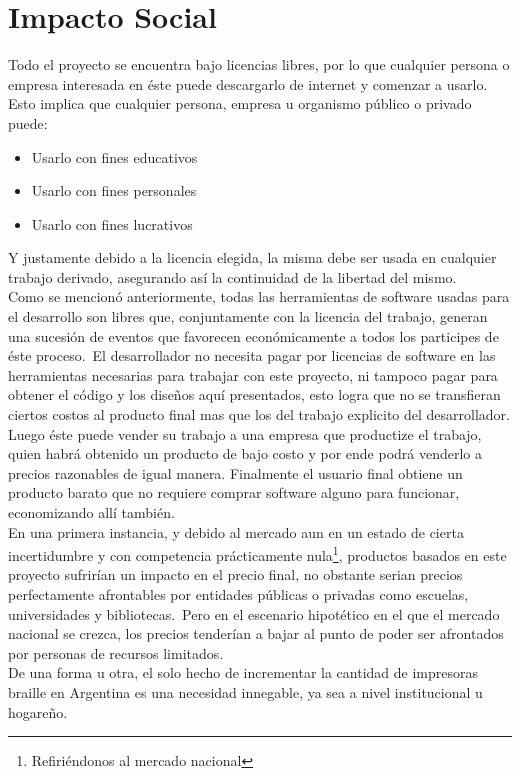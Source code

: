 \chapter{Impacto Social}

Todo el proyecto se encuentra bajo licencias libres, por lo que cualquier
persona o empresa interesada en \'este puede descargarlo de internet y
comenzar a usarlo. Esto implica que cualquier persona, empresa u organismo
p\'ublico o privado puede:

\begin{itemize}
 \item Usarlo con fines educativos
 \item Usarlo con fines personales
 \item Usarlo con fines lucrativos
\end{itemize}

Y justamente debido a la licencia elegida, la misma debe ser usada en cualquier
trabajo derivado, asegurando as\'i la continuidad de la libertad del mismo.\\

Como se mencion\'o anteriormente, todas las herramientas de software usadas
para el desarrollo son libres que, conjuntamente con la licencia del trabajo,
generan una sucesi\'on de eventos que favorecen econ\'omicamente a todos los
participes de \'este proceso.\
El desarrollador no necesita pagar por licencias de software en las
herramientas necesarias para trabajar con este proyecto, ni tampoco pagar para
obtener el c\'odigo y los dise\~nos aqu\'i presentados, esto logra que no se
transfieran ciertos costos al producto final mas que los del trabajo explicito
del desarrollador. Luego \'este puede vender su trabajo a una empresa que
productize el trabajo, quien habr\'a obtenido un producto de bajo costo y por
ende podr\'a venderlo a precios razonables de igual manera. Finalmente el
usuario final obtiene un producto barato que no requiere comprar software
alguno para funcionar, economizando all\'i tambi\'en.\\

En una primera instancia, y debido al mercado aun en un estado de cierta
incertidumbre y con competencia pr\'acticamente nula\footnote{Refiri\'endonos
al
mercado nacional}, productos basados en este proyecto sufrir\'ian un impacto en
el precio final, no obstante serian precios perfectamente afrontables por
entidades p\'ublicas o privadas como escuelas, universidades y bibliotecas.\ 
Pero en el escenario hipot\'etico en el que el mercado nacional se crezca, los
precios tender\'ian a bajar al punto de poder ser afrontados por personas de
recursos limitados.\\ 

De una forma u otra, el solo hecho de incrementar la cantidad de impresoras
braille en Argentina es una necesidad innegable, ya sea a nivel institucional u
hogare\~no.\\